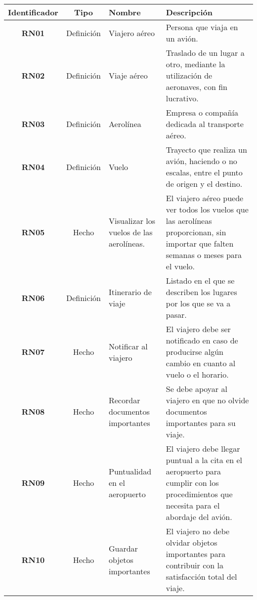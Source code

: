\begin{table}
	\begin{center}
		\begin{tabular}{|c|c|p{3cm}|p{5.7cm}|}
			\hline \rowcolor[RGB]{51,153,255} 
				\textcolor{blanco}{\bf Identificador} &
				\textcolor{blanco}{\bf Tipo} &
				\textcolor{blanco}{\bf Nombre} &
				\textcolor{blanco}{\bf Descripción} \\
			\hline 
				\textbf{RN01} &
				Definición &
				Viajero aéreo &
				Persona que viaja en un avión. \\
      		\hline \rowcolor[RGB]{240,248,255}
      			\textbf{RN02} &
				Definición &
				Viaje aéreo &
				Traslado de un lugar a otro, mediante la utilización de aeronaves, con fin lucrativo. \\
			\hline 
				\textbf{RN03} &
				Definición &
				Aerolínea &
				Empresa o compañía dedicada al transporte aéreo. \\ 
			\hline \rowcolor[RGB]{240,248,255}
				\textbf{RN04} &
				Definición &
				Vuelo &
				Trayecto que realiza un avión, haciendo o no escalas, entre el punto de origen y el destino. \\ 
			\hline 
				\textbf{RN05} &
				Hecho &
				Visualizar los vuelos de las aerolíneas. &
				El viajero aéreo puede ver todos los vuelos que las aerolíneas proporcionan, sin importar que falten semanas o meses para el vuelo. \\ 
			\hline \rowcolor[RGB]{240,248,255}
				\textbf{RN06} &
				Definición &
				Itinerario de viaje &
				Listado en el que se describen los lugares por los que se va a pasar. \\ 
			\hline 
				\textbf{RN07} &
				Hecho &
				Notificar al viajero &
				El viajero debe ser notificado en caso de producirse algún cambio en cuanto al vuelo o el horario. \\ 
			\hline \rowcolor[RGB]{240,248,255}
				\textbf{RN08} &
				Hecho &
				Recordar documentos importantes &
				Se debe apoyar al viajero en que no olvide documentos importantes para su viaje. \\ 
			\hline 
				\textbf{RN09} &
				Hecho &
				Puntualidad en el aeropuerto &
				El viajero debe llegar puntual a la cita en el aeropuerto para cumplir con los procedimientos que necesita para el abordaje del avión. \\ 
			\hline \rowcolor[RGB]{240,248,255}
				\textbf{RN10} &
				Hecho &
				Guardar objetos importantes &
				El viajero no debe olvidar objetos importantes para contribuir con la satisfacción total del viaje. \\ 

\end{tabular}
\end{center}
\end{table}
